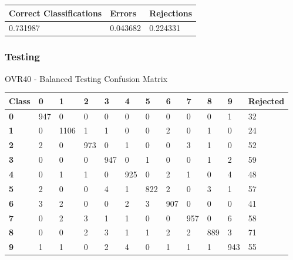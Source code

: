 \documentclass[
  a4paper,            %
  DIV=10,             %
  oneside,            %
  BCOR=5mm,           %
  parskip=half,       %
  numbers=noenddot,   %
  bibtotoc,           %
  listof=totoc,        %
  article
]{scrreprt}
\begin{document}
\begin{center}
  \begin{tabular}{|p{5cm}|p{3cm}|p{3cm}|}
    \hline
    \textbf{Correct Classifications} & \textbf{Errors} & \textbf{Rejections} \\
    \hline
    0.731987 & 0.043682 & 0.224331 \\
    \hline
  \end{tabular}
\end{center}
\subsubsection{Testing}
\begin{center}
  \small{OVR40 - Balanced Testing Confusion Matrix}
  \begin{tabular}{|p{1cm}|p{1cm}|p{1cm}|p{1cm}|p{1cm}|p{1cm}|p{1cm}|p{1cm}|p{1cm}|p{1cm}|p{1cm}|p{1.7cm}|}
    \hline
    \textbf{Class} & \textbf{0} & \textbf{1} & \textbf{2} & \textbf{3} & \textbf{4} & \textbf{5} & \textbf{6} & \textbf{7} & \textbf{8} & \textbf{9} & \textbf{Rejected} \\
    \hline
    \textbf{0} & 947 & 0 & 0 & 0 & 0 & 0 & 0 & 0 & 0 & 1 & 32 \\
    \hline
    \textbf{1} & 0 & 1106 & 1 & 1 & 0 & 0 & 2 & 0 & 1 & 0 & 24 \\
    \hline
    \textbf{2} & 2 & 0 & 973 & 0 & 1 & 0 & 0 & 3 & 1 & 0 & 52 \\
    \hline
    \textbf{3} & 0 & 0 & 0 & 947 & 0 & 1 & 0 & 0 & 1 & 2 & 59 \\
    \hline
    \textbf{4} & 0 & 1 & 1 & 0 & 925 & 0 & 2 & 1 & 0 & 4 & 48 \\
    \hline
    \textbf{5} & 2 & 0 & 0 & 4 & 1 & 822 & 2 & 0 & 3 & 1 & 57 \\
    \hline
    \textbf{6} & 3 & 2 & 0 & 0 & 2 & 3 & 907 & 0 & 0 & 0 & 41 \\
    \hline
    \textbf{7} & 0 & 2 & 3 & 1 & 1 & 0 & 0 & 957 & 0 & 6 & 58 \\
    \hline
    \textbf{8} & 0 & 0 & 2 & 3 & 1 & 1 & 2 & 2 & 889 & 3 & 71 \\
    \hline
    \textbf{9} & 1 & 1 & 0 & 2 & 4 & 0 & 1 & 1 & 1 & 943 & 55 \\
    \hline
  \end{tabular}
\end{center}
\end{document}
